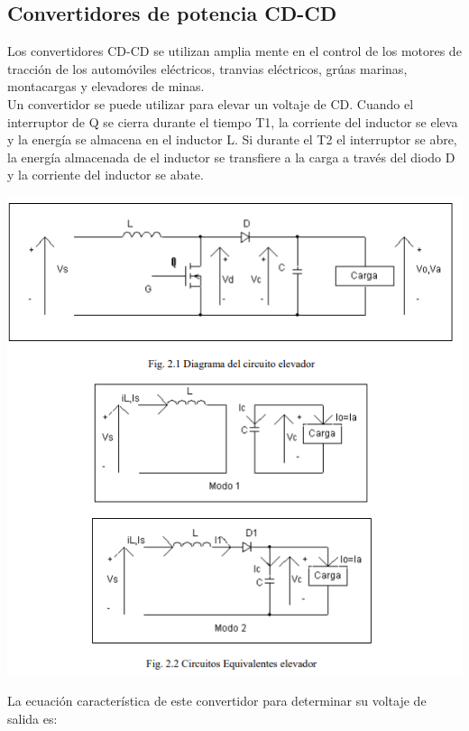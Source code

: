 \documentclass[12pt,a4paper]{article}
\begin{document}
\linebreak
\linebreak
\begin{flushleft}
\section{Convertidores de potencia CD-CD}
\end{flushleft}
\begin{flushleft}
Los convertidores CD-CD se utilizan amplia mente en el control de los motores de tracción de los automóviles eléctricos, tranvias eléctricos, grúas marinas, montacargas y elevadores de minas.\\
Un convertidor se puede utilizar para elevar un voltaje de CD. Cuando el interruptor de Q se cierra durante el tiempo T1, la corriente del inductor se eleva y la energía se almacena en el inductor L. Si durante el T2 el interruptor se abre, la energía almacenada de el inductor se transfiere a la carga a través del diodo D y la corriente del inductor se abate.
\begin{center}
\includegraphics[scale=1.1]{imagenes/CD_CD.png} 
\end{center}
\newpage
La ecuación característica de este convertidor para determinar su voltaje de salida es: 

\end{flushleft}
\end{document}
